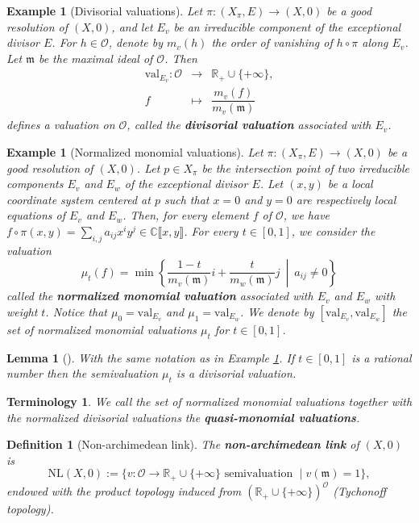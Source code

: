 \documentclass[reqno,dvipsnames,12pt]{amsart}
\newtheorem{lemm}[thm]{Lemma}
\newtheorem{defi}[thm]{Definition}
\newtheorem{term}[thm]{Terminology}
\newtheorem{exam}[thm]{Example}
\begin{document}
\begin{exam}[Divisorial valuations]
Let $\pi:(X_\pi,E) \longrightarrow (X,0)$ be a good resolution of $(X,0)$, and let $E_v$ be an irreducible component of the exceptional divisor $E$. For $h \in \mathcal{O}$, denote by $m_v(h)$ the order of vanishing of $h \circ \pi$ along $E_v$. Let $\mathfrak{m}$ be the maximal ideal of $\mathcal{O}$. Then
\[
\begin{array}{rcl}
\mathrm{val}_{E_v}:\mathcal{O} &\to& \mathbb{R}_+ \cup \{+\infty\}, \\
f &\mapsto& \dfrac{m_v(f)}{m_v(\mathfrak{m})}
\end{array}
\]
defines a valuation on $\mathcal{O}$, called the \textbf{divisorial valuation} associated with $E_v$.
\end{exam}
\begin{exam}[Normalized monomial valuations]\label{monomial}
Let $\pi: (X_\pi,E) \longrightarrow (X,0)$ be a good resolution of $(X,0)$. Let $p \in X_{\pi}$ be the intersection point of two irreducible components $E_v$ and $E_{w}$ of the exceptional divisor $E$. Let $(x,y)$ be a local coordinate system centered at $p$ such that $x=0$ and $y=0$ are respectively local equations of $E_v$ and $E_w$. Then, for every element $f$ of $\mathcal{O}$, we have $f\circ \pi (x,y) = \sum_{i,j} a_{ij} x^{i} y^{j} \in \mathbb{C}\llbracket x,y \rrbracket$. For every $t \in [0,1]$, we consider the valuation
\[
\mu_t(f)=\min \left\{\frac{1-t}{m_v(\mathfrak{m})}i + \frac{t}{m_w(\mathfrak{m})}j \ \middle|\ a_{ij} \neq 0 \right\}
\]
called the \textbf{normalized monomial valuation} associated with $E_v$ and $E_w$ with weight $t$.
Notice that $\mu_0= \mathrm{val}_{E_v}$ and $\mu_1= \mathrm{val}_{E_w}$. We denote by $[\mathrm{val}_{E_v}, \mathrm{val}_{E_w}]$ the set of normalized monomial valuations $\mu_t$ for $t \in [0,1]$.
\end{exam}
\begin{lemm}[{\cite[Subsection 2.1]{GignacRuggiero2017}}]\label{density}
With the same notation as in Example \ref{monomial}. If $t \in [0,1]$ is a rational number then the semivaluation $\mu_t$ is a divisorial valuation. 



\end{lemm}

\begin{term}\label{quasi-monomial}
We call the set of normalized monomial valuations together with the normalized divisorial valuations the \textbf{quasi-monomial valuations}.
\end{term}
\begin{defi}[Non-archimedean link]\label{linknonarchimedien}
The \textbf{non-archimedean link} of $(X,0)$ is
\[
\mathrm{NL}(X,0) := \{ v : \mathcal{O} \to \mathbb{R}_+ \cup \{+\infty\} \text{ semivaluation } \mid v(\mathfrak{m})=1 \},
\]
endowed with the product topology induced from
$(\mathbb{R}_+ \cup \{+\infty\})^{\mathcal{O}}$ (Tychonoff topology).
\end{defi}
\end{document}
